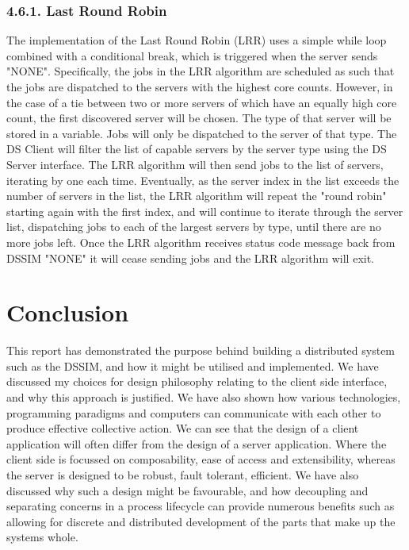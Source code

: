 \documentclass[a4paper]{article} %
\begin{document}
\subsubsection*{4.6.1. Last Round Robin}
The implementation of the Last Round Robin (LRR) uses a simple while loop combined with a conditional break, which is triggered when the server sends "NONE". Specifically, the jobs in the LRR algorithm are scheduled as such that the jobs are dispatched to the servers with the highest core counts. However, in the case of a tie between two or more servers of which have an equally high core count, the first discovered server will be chosen. The type of that server will be stored in a variable. Jobs will only be dispatched to the server of that type. The DS Client will filter the list of capable servers by the server type using the DS Server interface. The LRR algorithm will then send jobs to the list of servers, iterating by one each time. Eventually, as the server index in the list exceeds the number of servers in the list, the LRR algorithm will repeat the "round robin" starting again with the first index, and will continue to iterate through the server list, dispatching jobs to each of the largest servers by type, until there are no more jobs left. Once the LRR algorithm receives status code message back from DSSIM "NONE" it will cease sending jobs and the LRR algorithm will exit.

\section*{Conclusion}
This report has demonstrated the purpose behind building a distributed system such as the DSSIM, and how it might be utilised and implemented. We have discussed my choices for design philosophy relating to the client side interface, and why this approach is justified. We have also shown how various technologies, programming paradigms and computers can communicate with each other to produce effective collective action. We can see that the design of a client application will often differ from the design of a server application. Where the client side is focussed on composability, ease of access and extensibility, whereas the server is designed to be robust, fault tolerant, efficient. We have also discussed why such a design might be favourable, and how decoupling and separating concerns in a process lifecycle can provide numerous benefits such as allowing for discrete and distributed development of the parts that make up the systems whole.
\end{document}
